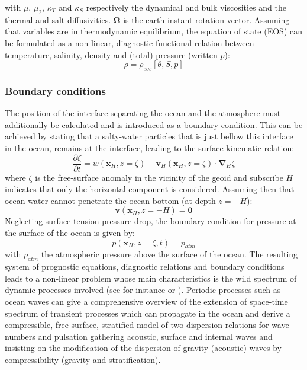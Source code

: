 with $\mu$, $\mu_2$, $\kappa_T$ and $\kappa_S$ respectively the dynamical and bulk viscosities and the thermal and salt diffusivities. $\mathbf{\Omega}$ is the earth instant rotation vector.
Assuming that variables are in thermodynamic equilibrium, the equation of state (EOS) can be formulated as a non-linear, diagnostic functional relation between temperature, salinity, density and (total) pressure (written $p$):
\begin{equation}
 \label{NS_e}
 \rho = \rho_{eos}[\theta,S,p]
\end{equation}

\subsubsection{Boundary conditions}
The position of the interface separating the ocean and the atmosphere must additionally be calculated and is introduced as a boundary condition. This can be achieved by stating that a salty-water particles that is just bellow this interface in the ocean, remains at the interface, leading to the surface kinematic relation:
\begin{equation}
  \displaystyle
  \label{NS_BC2}
  \frac{\partial \zeta}{\partial t}=w(\mathbf{x}_{\scriptscriptstyle H},z=\zeta)-\mathbf{v}_H(\mathbf{x}_{\scriptscriptstyle H},z=\zeta)\cdot\mathbf{\nabla}_H\zeta
\end{equation}
where $\zeta$ is the free-surface anomaly in the vicinity of the geoid and subscribe $H$ indicates that only the horizontal component is considered. Assuming then that ocean water cannot penetrate the ocean bottom (at depth $z=-H$):
\begin{equation}
 \displaystyle
 \label{NS_BC0}
  \mathbf{v}(\mathbf{x}_{\scriptscriptstyle H},z=-H)=\mathbf{0}
\end{equation}
Neglecting surface-tension pressure drop, the boundary condition for pressure at the surface of the ocean is given by:
\begin{equation}
 \displaystyle
 \label{NS_BC1}
  p(\mathbf{x}_{\scriptscriptstyle H},z=\zeta,t)= p_{atm}
\end{equation}
with $p_{atm}$ the atmospheric pressure above the surface of the ocean.
The resulting system of prognostic equations, diagnostic relations and boundary conditions leads to a non-linear problem whose main characteristics is the wild spectrum of dynamic processes involved (see for instance \cite{gill_atmosphere-ocean_1982} or \cite{vallis_atmospheric_2006}). Periodic processes such as ocean waves can give a comprehensive overview of the extension of space-time spectrum of transient processes which can propagate in the ocean and \cite{auclair_modied_2021} derive a compressible, free-surface, stratified model of two dispersion relations for wave-numbers and pulsation gathering acoustic, surface and internal waves and insisting on the modification of the dispersion of gravity (acoustic) waves by compressibility (gravity and stratification).

